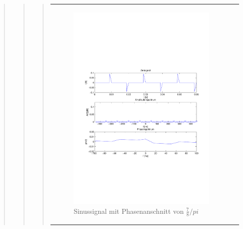 \begin{quote}
\begin{quote}
\begin{quote}
\begin{center}
\begin{tabular}{ll}
\begin{minipage}{0.6\textwidth}
                    \end{minipage}
                    \begin{minipage}{0.6\textwidth}
    
                       \begin{figure}[H]
                            \label{fig:}
                            \includegraphics[scale=0.5, trim = 1.5cm 7cm 1.5cm 8.5cm,
                            clip]{./Bilder/Phasenanschnitt78pi.pdf} %
                            \caption{Sinussignal mit Phasenanschnitt von $\frac{7}{8}/pi$}
                        \end{figure}
                     \vspace{-1.5em}
    
                    \end{minipage}
    

\end{tabular}
\end{center}
\end{quote}
\end{quote}
\end{quote}
